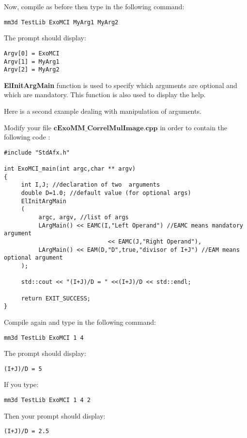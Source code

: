 \documentclass[a4paper]{book}
\begin{document}
Now, compile as before then type in the following command:
\begin{lstlisting}
mm3d TestLib ExoMCI MyArg1 MyArg2
\end{lstlisting}

The prompt should display:\newline

\begin{lstlisting}
Argv[0] = ExoMCI
Argv[1] = MyArg1
Argv[2] = MyArg2
\end{lstlisting}

\textbf{ElInitArgMain} function is used to specify which arguments are optional and which are mandatory. This function is also used to display the help. \newline

Here is a second example dealing with manipulation of arguments.\newline

Modify your file $\textbf{cExoMM\_CorrelMulImage.cpp}$ in order to contain the following code :

\begin{lstlisting}
#include "StdAfx.h"

int ExoMCI_main(int argc,char ** argv)
{
     int I,J; //declaration of two  arguments
     double D=1.0; //default value (for optional args)
     ElInitArgMain
     (
          argc, argv, //list of args
          LArgMain() << EAMC(I,"Left Operand") //EAMC means mandatory argument
                              << EAMC(J,"Right Operand"),
          LArgMain() << EAM(D,"D",true,"divisor of I+J") //EAM means optional argument
     );

     std::cout << "(I+J)/D = " <<(I+J)/D << std::endl;

     return EXIT_SUCCESS;
}
\end{lstlisting}

Compile again and type in the following command:
\begin{lstlisting}
mm3d TestLib ExoMCI 1 4
\end{lstlisting}

The prompt should display:
\begin{lstlisting}
(I+J)/D = 5
\end{lstlisting}

If you type:
\begin{lstlisting}
mm3d TestLib ExoMCI 1 4 2
\end{lstlisting}

Then your prompt should display:
\begin{lstlisting}
(I+J)/D = 2.5
\end{lstlisting}
\end{document}
